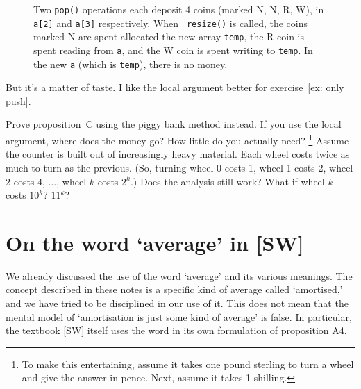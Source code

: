 \documentclass{tstextbook}
\begin{document}
\begin{figure}
  \caption{ Two {\tt pop()} operations each deposit 4 coins (marked N, N, R,
    W), in {\tt a[2]} and {\tt a[3]} respectively.  When {\tt
      resize()} is called, the coins marked N are spent allocated the
    new array {\tt temp}, the R coin is spent reading from {\tt a},
    and the W coin is spent writing to {\tt temp}. In the new {\tt a}
    (which is {\tt temp}), there is no money.  }
\end{figure}

But it's a matter of taste. I like the local argument better for
exercise~\ref{ex: only push}.



\begin{ExerciseList}
\Exercise
Prove proposition~C using the piggy bank method instead.
If you use the local argument, where does the money go?
How little do you actually need?
\footnote{To make this entertaining, assume it takes one pound
  sterling to turn a wheel and give the answer in pence.
  Next, assume it takes 1 shilling.}
\Exercise
 Assume the counter is built out of increasingly heavy material. 
 Each wheel costs twice as much to turn as the previous.
 (So, turning wheel 0 costs 1, wheel 1 costs 2, wheel 2 costs 4, 
 $\ldots$,  wheel $k$ costs $2^k$.)
 Does the analysis still work?
 What if wheel $k$ costs $10^k$? $11^k$?
\end{ExerciseList}

\section{On the word `average' in [SW]}

We already discussed the use of the word `average' and its various meanings.
The concept described in these notes is a specific kind of average called `amortised,' and we have tried to be disciplined in our use of it.
This does not mean that the mental model of `amortisation is just some kind of average' is false.
In particular, the textbook [SW] itself uses the word in its own formulation of proposition A4.
\end{document}
